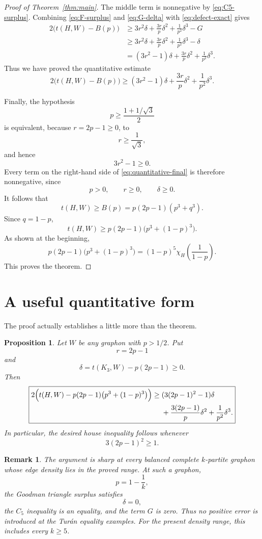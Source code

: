 \documentclass[11pt]{article}
\newtheorem{proposition}[theorem]{Proposition}
\newtheorem{remark}[theorem]{Remark}
\begin{document}
\begin{proof}[Proof of Theorem~\ref{thm:main}]
The middle term is nonnegative by
\eqref{eq:C5-surplus}.  Combining
\eqref{eq:F-surplus} and \eqref{eq:G-delta} with
\eqref{eq:defect-exact} gives
\[
\begin{aligned}
2\bigl(t(H,W)-B(p)\bigr)
&\ge
3r^2\delta
+
\frac{3r}{p}\delta^2
+
\frac1{p^2}\delta^3
-G\\
&\ge
3r^2\delta
+
\frac{3r}{p}\delta^2
+
\frac1{p^2}\delta^3
-\delta\\
&=
(3r^2-1)\delta
+
\frac{3r}{p}\delta^2
+
\frac1{p^2}\delta^3.
\end{aligned}
\]
Thus we have proved the quantitative estimate
\begin{equation}\label{eq:quantitative-final}
\boxed{
2\bigl(t(H,W)-B(p)\bigr)
\ge
(3r^2-1)\delta
+
\frac{3r}{p}\delta^2
+
\frac1{p^2}\delta^3.
}
\end{equation}

Finally, the hypothesis
\[
p\ge\frac{1+1/\sqrt3}{2}
\]
is equivalent, because \(r=2p-1\ge0\), to
\[
r\ge\frac1{\sqrt3},
\]
and hence
\[
3r^2-1\ge0.
\]
Every term on the right-hand side of
\eqref{eq:quantitative-final} is therefore nonnegative, since
\[
p>0,\qquad r\ge0,\qquad \delta\ge0.
\]
It follows that
\[
t(H,W)\ge B(p)
=
p(2p-1)(p^3+q^3).
\]
Since \(q=1-p\),
\[
t(H,W)
\ge
p(2p-1)
\bigl(p^3+(1-p)^3\bigr).
\]
As shown at the beginning,
\[
p(2p-1)
\bigl(p^3+(1-p)^3\bigr)
=
(1-p)^5
\chi_H\!\left(\frac1{1-p}\right).
\]
This proves the theorem.
\end{proof}

\section{A useful quantitative form}

The proof actually establishes a little more than the theorem.

\begin{proposition}\label{prop:quantitative}
Let \(W\) be any graphon with \(p>1/2\).  Put
\[
r=2p-1
\]
and
\[
\delta
=
t(K_3,W)-p(2p-1)\ge0.
\]
Then
\[
\boxed{
\begin{aligned}
2\Bigl(
t(H,W)
-
p(2p-1)
\bigl(p^3+(1-p)^3\bigr)
\Bigr)
\ge{}&
(3(2p-1)^2-1)\delta\\
&+
\frac{3(2p-1)}{p}\delta^2
+
\frac1{p^2}\delta^3.
\end{aligned}
}
\]
In particular, the desired house inequality follows whenever
\[
3(2p-1)^2\ge1.
\]
\end{proposition}

\begin{remark}
The argument is sharp at every balanced complete \(k\)-partite graphon
whose edge density lies in the proved range.  At such a graphon,
\[
p=1-\frac1k,
\]
the Goodman triangle surplus satisfies
\[
\delta=0,
\]
the \(C_5\) inequality is an equality, and the term \(G\) is zero.
Thus no positive error is introduced at the Tur\'an equality examples.
For the present density range, this includes every \(k\ge5\).
\end{remark}
\end{document}

